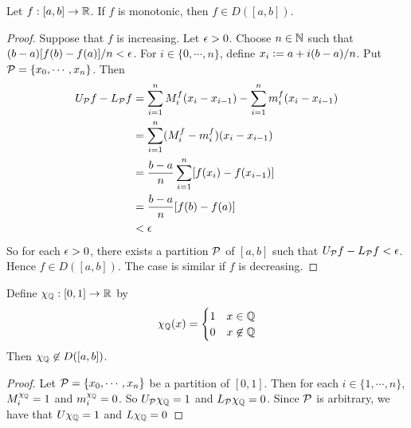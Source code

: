 \documentclass{book}
\begin{document}
	\begin{ex}  
		Let $f:[a,b] \rightarrow \mathbb{R}$. If $f$ is monotonic, then $f \in D([a,b])$.
	\end{ex}

	\begin{proof}
		Suppose that $f$ is increasing. Let $\epsilon >0$. Choose $n \in \mathbb{N}$ such that $(b-a)[f(b) - f(a)] /n < \epsilon $. For $i \in \{0, \cdots, n\}$, define $x_i \vcentcolon= a + i(b-a)/n$. Put $\mathcal{P} = \{x_0, \cdots, x_n\}$. Then 
		\begin{align*}
			U_{\mathcal{P}} f - L_{\mathcal{P}} f 
			&= \sum\limits_{i=1}^n M^f_i(x_i - x_{i-1}) - \sum\limits_{i=1}^n m^f_i(x_i - x_{i-1}) \\
			&= \sum\limits_{i=1}^n (M^f_i - m^f_i)(x_i - x_{i-1}) \\
			&= \frac{b-a}{n} \sum\limits_{i=1}^n [f(x_i) - f(x_{i-1})]  \\
			&= \frac{b-a}{n} [f(b) - f(a)] \\
			& < \epsilon
		\end{align*}
	So for each $\epsilon >0$, there exists a partition $\mathcal{P}$ of $[a,b]$ such that $U_{\mathcal{P}} f - L_{\mathcal{P}} f < \epsilon$. Hence $f \in D([a,b])$. The case is similar if $f$ is decreasing. 
	\end{proof}

	\begin{ex}  
		Define $\chi_{\mathbb{Q}}:[0,1] \rightarrow \mathbb{R}$ by $$\chi_{\mathbb{Q}}(x) = \begin{cases}
			1 & x \in \mathbb{Q} \\
			0 & x \not \in \mathbb{Q}
		\end{cases}$$
		Then $\chi_{\mathbb{Q}} \not \in D([a,b])$.
	\end{ex}

	\begin{proof}
		Let $\mathcal{P} = \{x_0, \cdots, x_n\}$ be a partition of $[0,1]$. Then for each $i \in \{1, \cdots, n\}$, $M^{\chi_{\mathbb{Q}}}_i = 1$ and $m^{\chi_{\mathbb{Q}}}_i = 0$. So $U_{\mathcal{P}} \chi_{\mathbb{Q}} = 1$ and $L_{\mathcal{P}} \chi_{\mathbb{Q}} = 0$. Since $\mathcal{P}$ is arbitrary, we have that $U \chi_{\mathbb{Q}} = 1$ and $L \chi_{\mathbb{Q}} = 0$
	\end{proof}

	
	
	
	
	
	
	
	
	
	
	
	
	
	
	
	
	
	
	
	
\end{document}
